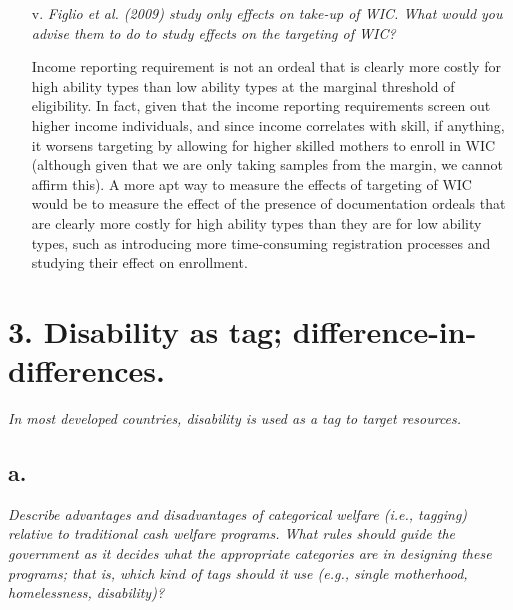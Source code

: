 \documentclass[
]{article}
\begin{document}
\begin{enumerate}
\item[v.] \textit{Figlio et al. (2009) study only effects on take-up of WIC. What would you advise them to do to study effects on the targeting of WIC?}  
  
Income reporting requirement is not an ordeal that is clearly more costly for high ability types than low ability types at the marginal threshold of eligibility. In fact, given that the income reporting requirements screen out higher income individuals, and since income correlates with skill, if anything, it worsens targeting by allowing for higher skilled mothers to enroll in WIC (although given that we are only taking samples from the margin, we cannot affirm this). A more apt way to measure the effects of targeting of WIC would be to measure the effect of the presence of documentation ordeals that are clearly more costly for high ability types than they are for low ability types, such as introducing more time-consuming registration processes and studying their effect on enrollment. 

\end{enumerate}

\hypertarget{disability-as-tag-difference-in-differences.}{%
\section{3. Disability as tag;
difference-in-differences.}\label{disability-as-tag-difference-in-differences.}}

\textit{In most developed countries, disability is used as a tag to target resources.}

\hypertarget{a.-2}{%
\subsection{a.}\label{a.-2}}

\textit{Describe advantages and disadvantages of categorical welfare (i.e., tagging) relative to traditional cash welfare programs. What rules should guide the government as it decides what the appropriate categories are in designing these programs; that is, which kind of tags should it use (e.g., single motherhood, homelessness, disability)?}
\end{document}

